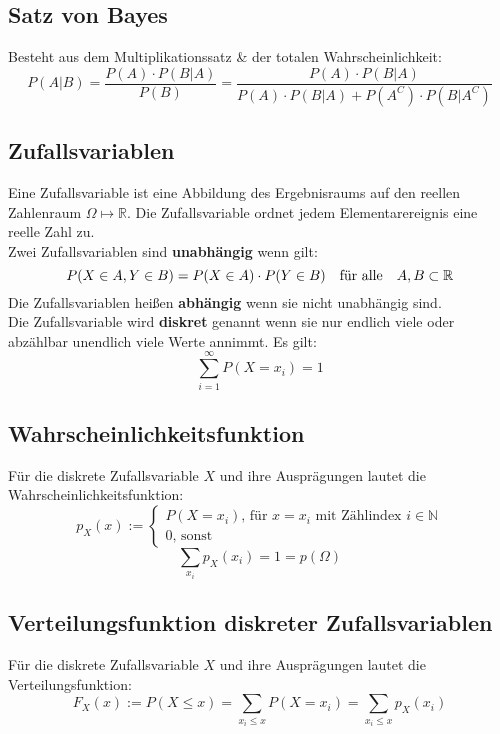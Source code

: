 \documentclass[12pt]{article}
\begin{document}
\subsection{Satz von Bayes}
Besteht aus dem Multiplikationssatz \& der totalen Wahrscheinlichkeit:
\begin{equation}
	P(A|B)=\frac{P(A)\cdot P(B|A)}{P(B)}= \frac{P(A)\cdot P(B|A)}{P(A)\cdot P(B|A) + P(A^C)\cdot P(B|A^C)}
\end{equation}
\subsection{Zufallsvariablen}
Eine Zufallsvariable ist eine Abbildung des Ergebnisraums auf den reellen Zahlenraum $\Omega\longmapsto\mathbb{R}$. Die Zufallsvariable ordnet jedem Elementarereignis eine reelle Zahl zu.\\
Zwei Zufallsvariablen sind \textbf{unabhängig} wenn gilt:
\begin{equation}
	P(X\in A, Y\in B) = P(X\in A) \cdot P(Y\in B) \text{\quad für alle\quad} A,B\subset \mathbb{R} 
\end{equation}
Die Zufallsvariablen heißen \textbf{abhängig} wenn sie nicht unabhängig sind.\\
Die Zufallsvariable wird \textbf{diskret} genannt wenn sie nur endlich viele oder abzählbar unendlich viele Werte annimmt. Es gilt:
\begin{equation}
	\sum\limits_{i=1}^\infty P(X=x_i)=1
\end{equation}
\subsection{Wahrscheinlichkeitsfunktion}
Für die diskrete Zufallsvariable $X$ und ihre Ausprägungen lautet die Wahrscheinlichkeitsfunktion:
\begin{equation}
	p_X(x):=
	\begin{cases}
		P(X=x_i) \text{, für } x = x_i \text{ mit Zählindex } i \in \mathbb{N}\\
		0 \text{, sonst}
	\end{cases}
\end{equation}
\begin{equation}
	\sum\limits_{x_i}p_X(x_i)=1=p(\Omega)
\end{equation}
\subsection{Verteilungsfunktion diskreter Zufallsvariablen}
Für die diskrete Zufallsvariable $X$ und ihre Ausprägungen lautet die Verteilungsfunktion:
\begin{equation}
	F_X(x):=P(X\leq x)=\sum_{x_i\leq x}P(X=x_i)=\sum_{x_i\leq x}p_X(x_i)
\end{equation}
\end{document}
